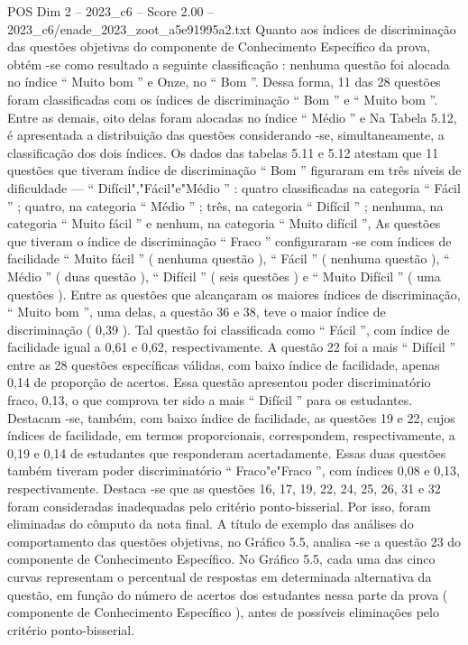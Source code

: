 \begin{textsample}{POS Dim 2 – 2023\_c6 – Score 2.00 – 2023\_c6/enade\_2023\_zoot\_a5e91995a2.txt}
Quanto aos índices de discriminação das questões objetivas do componente de Conhecimento Específico da prova, obtém -se como resultado a seguinte classificação : nenhuma questão foi alocada no índice “ Muito bom ” e Onze, no “ Bom ”.
Dessa forma, 11 das 28 questões foram classificadas com os índices de discriminação “ Bom ” e “ Muito bom ”.
Entre as demais, oito delas foram alocadas no índice “ Médio ” e Na Tabela 5.12, é apresentada a distribuição das questões considerando -se, simultaneamente, a classificação dos dois índices.
Os dados das tabelas 5.11 e 5.12 atestam que 11 questões que tiveram índice de discriminação “ Bom ” figuraram em três níveis de dificuldade — “ Difícil","Fácil"e"Médio ” : quatro classificadas na categoria “ Fácil ” ; quatro, na categoria “ Médio ” ; três, na categoria “ Difícil ” ; nenhuma, na categoria “ Muito fácil ” e nenhum, na categoria “ Muito difícil ”, As questões que tiveram o índice de discriminação “ Fraco ” configuraram -se com índices de facilidade “ Muito fácil ” ( nenhuma questão ), “ Fácil ” ( nenhuma questão ), “ Médio ” ( duas questão ), “ Difícil ” ( seis questões ) e “ Muito Difícil ” ( uma questões ).
Entre as questões que alcançaram os maiores índices de discriminação, “ Muito bom ”, uma delas, a questão 36 e 38, teve o maior índice de discriminação ( 0,39 ).
Tal questão foi classificada como “ Fácil ”, com índice de facilidade igual a 0,61 e 0,62, respectivamente.
A questão 22 foi a mais “ Difícil ” entre as 28 questões específicas válidas, com baixo índice de facilidade, apenas 0,14 de proporção de acertos.
Essa questão apresentou poder discriminatório fraco, 0,13, o que comprova ter sido a mais “ Difícil ” para os estudantes.
Destacam -se, também, com baixo índice de facilidade, as questões 19 e 22, cujos índices de facilidade, em termos proporcionais, correspondem, respectivamente, a 0,19 e 0,14 de estudantes que responderam acertadamente.
Essas duas questões também tiveram poder discriminatório “ Fraco"e"Fraco ”, com índices 0,08 e 0,13, respectivamente.
Destaca -se que as questões 16, 17, 19, 22, 24, 25, 26, 31 e 32 foram consideradas inadequadas pelo critério ponto-bisserial.
Por isso, foram eliminadas do cômputo da nota final.
A título de exemplo das análises do comportamento das questões objetivas, no Gráfico 5.5, analisa -se a questão 23 do componente de Conhecimento Específico.
No Gráfico 5.5, cada uma das cinco curvas representam o percentual de respostas em determinada alternativa da questão, em função do número de acertos dos estudantes nessa parte da prova ( componente de Conhecimento Específico ), antes de possíveis eliminações pelo critério ponto-bisserial.

\end{textsample}
